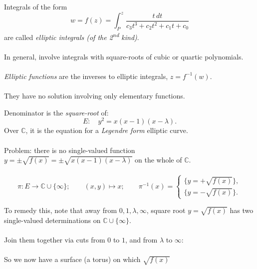 \documentclass{beamer}
\begin{document}
\begin{frame}
	Integrals of the form
	\begin{equation*}
		w = f(z) = \int_{P}^{z} \frac{t\, dt}{c_{3}t^{3} + c_{2}t^{2} + c_{1}t + c_{0}}
	\end{equation*}
	are called \emph{elliptic integrals (of the 2\textsuperscript{nd} kind)}. \\~\\
	
	In general, involve integrals with square-roots of cubic or quartic polynomials. \\~\\
	
	\emph{Elliptic functions} are the inverses to elliptic integrals, $z = f^{-1}(w)$. \\~\\
		
	They have no solution involving only elementary functions.
\end{frame}

\begin{frame}
	Denominator is the \emph{square-root} of:
	\begin{equation*}
		E: \quad y^{2} = x(x-1)(x-\lambda).
	\end{equation*}
	Over $\mathbb{C}$, it is the equation for a \emph{Legendre form} elliptic curve. \\~\\
	
	Problem: there is no single-valued function $y = \pm\sqrt{f(x)} = \pm\sqrt{x(x-1)(x-\lambda)}$ on the whole of $\mathbb{C}$. \\~\\
	
	$$
		\pi : E \rightarrow \mathbb{C}\cup \{\infty\}; \qquad (x,y) \longmapsto x; \qquad \pi^{-1}(x) = \begin{cases}
		\big\{ y = + \sqrt{f(x)} \big\}, \\
		\big\{ y = - \sqrt{f(x)} \big\}.
		\end{cases}
	$$
\end{frame}
	
\begin{frame}
	To remedy this, note that away from $0, 1, \lambda, \infty$, square root $y = \sqrt{f(x)}$ has two single-valued determinations on $\mathbb{C} \cup \{\infty\}$. \\~\\
	
	Join them together via cuts from $0$ to $1$, and from $\lambda$ to $\infty$: \\~\\
	
	So we now have a surface (a torus) on which $\sqrt{f(x)}$ 
	
	
\end{frame}
\end{document}
